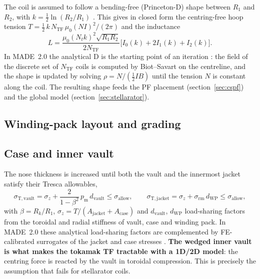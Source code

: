 The coil is assumed to follow a bending-free (Princeton-D) shape between
$R_1$ and $R_2$, with $k=\tfrac12\ln(R_2/R_1)$
\cite{File1971,Gralnick1976,Thome1982}. This gives in
closed form the centring-free hoop tension
$T=\tfrac12\,k\,N_\mathrm{TF}\,\mu_0 (NI)^2/(2\pi)$ and the inductance
\begin{equation}
L=\frac{\mu_0 (N_t k)^2 \sqrt{R_1R_2}}{2N_\mathrm{TF}}
\big[I_0(k)+2I_1(k)+I_2(k)\big].
\end{equation}
In MADE~2.0 the analytical D is the starting point of an iteration
\cite{Giannini2024MADEIII}: the field of the discrete set of $N_\mathrm{TF}$
coils is computed by Biot--Savart on the centreline, and the shape is
updated by solving $\rho = N/(\tfrac12 I B)$ until the tension $N$ is
constant along the coil. The resulting shape feeds the PF placement
(section~\ref{sec:cspf}) and the global model
(section~\ref{sec:stellarator}).

\subsection{Winding-pack layout and grading}

\subsection{Case and inner vault}
The nose thickness is increased until both the vault and the innermost
jacket satisfy their Tresca allowables,
\begin{equation}
  \sigma_\mathrm{T,vault}=\sigma_z+\frac{2}{1-\beta^2}\,p_\mathrm{m}\,
  d_\mathrm{vault} \le \sigma_\mathrm{allow},\qquad
  \sigma_\mathrm{T,jacket}=\sigma_z+\sigma_\mathrm{rm}\,d_\mathrm{WP}
  \le \sigma_\mathrm{allow},
\end{equation}
with $\beta=R_k/R_1$, $\sigma_z=T/(A_\mathrm{jacket}+A_\mathrm{case})$ and
$d_\mathrm{vault}$, $d_\mathrm{WP}$ load-sharing factors from the
toroidal and radial stiffness of vault, case and winding pack.
In MADE~2.0 these analytical load-sharing factors are complemented by
FE-calibrated surrogates of the jacket and case stresses
.
\textbf{The wedged inner vault is what makes the tokamak TF tractable with
a 1D/2D model}: the centring force is reacted by the vault in toroidal
compression. This is precisely the assumption that fails for stellarator
coils.

